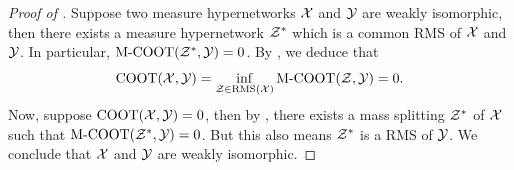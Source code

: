 \begin{proof}[Proof of ]
    Suppose two measure hypernetworks $\mathcal X$ and $\mathcal Y$ are weakly isomorphic,
    then there exists a measure hypernetwork $\mathcal Z^*$ which is a common RMS of $\mathcal X$ and $\mathcal Y$.
    In particular, $\text{M-COOT}(\mathcal Z^*, \mathcal Y) = 0$. By , we deduce that
    \begin{equation}
      \text{COOT}(\mathcal X, \mathcal Y) = \inf_{\mathcal Z \in \text{RMS}(\mathcal X)} \text{M-COOT}(\mathcal Z, \mathcal Y) = 0.
    \end{equation}
    Now, suppose $\text{COOT}(\mathcal X, \mathcal Y)=0$, then by ,
    there exists a mass splitting $\mathcal Z^*$ of $\mathcal X$ such that
    $\text{M-COOT}(\mathcal Z^*, \mathcal Y) = 0$. But this also means $\mathcal Z^*$ is a RMS of $\mathcal Y$.
    We conclude that $\mathcal X$ and $\mathcal Y$ are weakly isomorphic.
\end{proof}

